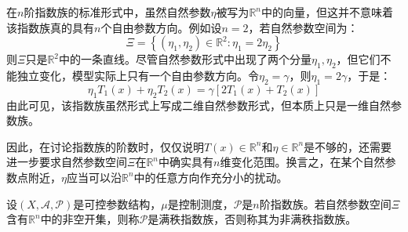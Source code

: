 \begin{note}
	在$n$阶指数族的标准形式中，虽然自然参数$\eta$被写为$\mathbb{R}^{n}$中的向量，但这并不意味着该指数族真的具有$n$个自由参数方向。例如设$n=2$，若自然参数空间为：
	\begin{equation*}
		\Xi=\left\{(\eta_1,\eta_2)\in\mathbb{R}^{2}:\eta_1=2\eta_2\right\}
	\end{equation*}
	则$\Xi$只是$\mathbb{R}^{2}$中的一条直线。尽管自然参数形式中出现了两个分量$\eta_1,\eta_2$，但它们不能独立变化，模型实际上只有一个自由参数方向。令$\eta_2=\gamma$，则$\eta_1=2\gamma$，于是：
	\begin{equation*}
		\eta_1T_1(x)+\eta_2T_2(x)=\gamma\left[2T_1(x)+T_2(x)\right]
	\end{equation*}
	由此可见，该指数族虽然形式上写成二维自然参数形式，但本质上只是一维自然参数族。\par
	因此，在讨论指数族的阶数时，仅仅说明$T(x)\in\mathbb{R}^{n}$和$\eta\in\mathbb{R}^{n}$是不够的，还需要进一步要求自然参数空间$\Xi$在$\mathbb{R}^{n}$中确实具有$n$维变化范围。换言之，在某个自然参数点附近，$\eta$应当可以沿$\mathbb{R}^{n}$中的任意方向作充分小的扰动。
\end{note}
\begin{definition}
	设$(X,\mathscr{A},\mathscr{P})$是可控参数结构，$\mu$是控制测度，$\mathscr{P}$是$n$阶指数族。若自然参数空间$\Xi$含有$\mathbb{R}^{n}$中的非空开集，则称$\mathscr{P}$是满秩指数族，否则称其为非满秩指数族。
\end{definition}
